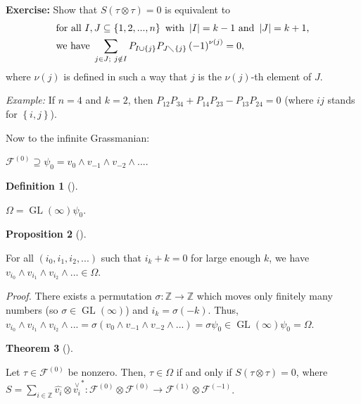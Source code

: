 \documentclass
[numbers=enddot,12pt,final,onecolumn,german,notitlepage]{scrartcl}%
\theoremstyle{definition}
\newtheorem{theo}{Theorem}
\newenvironment{theorem}[1][]
{\begin{theo}[#1]\begin{leftbar}}
{\end{leftbar}\end{theo}}
\newtheorem{prop}[theo]{Proposition}
\newenvironment{proposition}[1][]
{\begin{prop}[#1]\begin{leftbar}}
{\end{leftbar}\end{prop}}
\newtheorem{defi}[theo]{Definition}
\newenvironment{definition}[1][]
{\begin{defi}[#1]\begin{leftbar}}
{\end{leftbar}\end{defi}}
\begin{document}
\textbf{Exercise:} Show that $S\left(  \tau\otimes\tau\right)  =0$ is
equivalent to%
\begin{align*}
&  \text{for all }I,J\subseteq\left\{  1,2,...,n\right\}  \text{ with
}\left\vert I\right\vert =k-1\text{ and }\left\vert J\right\vert
=k+1\text{,}\\
&  \text{we have }\sum_{j\in J;\ j\notin I}P_{I\cup\left\{  j\right\}
}P_{J\diagdown\left\{  j\right\}  }\left(  -1\right)  ^{\nu\left(  j\right)
}=0,
\end{align*}
where $\nu\left(  j\right)  $ is defined in such a way that $j$ is the
$\nu\left(  j\right)  $-th element of $J$.

\textit{Example:} If $n=4$ and $k=2$, then $P_{12}P_{34}+P_{14}P_{23}%
-P_{13}P_{24}=0$ (where $ij$ stands for $\left\{  i,j\right\}  $).

Now to the infinite Grassmanian:

$\mathcal{F}^{\left(  0\right)  }\supseteq\psi_{0}=v_{0}\wedge v_{-1}\wedge
v_{-2}\wedge...$.

\begin{definition}
$\Omega=\operatorname*{GL}\left(  \infty\right)  \psi_{0}$.
\end{definition}

\begin{proposition}
For all $\left(  i_{0},i_{1},i_{2},...\right)  $ such that $i_{k}+k=0$ for
large enough $k$, we have $v_{i_{0}}\wedge v_{i_{1}}\wedge v_{i_{2}}%
\wedge...\in\Omega$.
\end{proposition}

\textit{Proof.} There exists a permutation $\sigma:\mathbb{Z}\rightarrow
\mathbb{Z}$ which moves only finitely many numbers (so $\sigma\in
\operatorname*{GL}\left(  \infty\right)  $) and $i_{k}=\sigma\left(
-k\right)  $. Thus, $v_{i_{0}}\wedge v_{i_{1}}\wedge v_{i_{2}}\wedge
...=\sigma\left(  v_{0}\wedge v_{-1}\wedge v_{-2}\wedge...\right)  =\sigma
\psi_{0}\in\operatorname*{GL}\left(  \infty\right)  \psi_{0}=\Omega$.

\begin{theorem}
Let $\tau\in\mathcal{F}^{\left(  0\right)  }$ be nonzero. Then, $\tau\in
\Omega$ if and only if $S\left(  \tau\otimes\tau\right)  =0$, where
$S=\sum\limits_{i\in\mathbb{Z}}\widehat{v_{i}}\otimes\overset{\vee}{v_{i}%
}^{\ast}:\mathcal{F}^{\left(  0\right)  }\otimes\mathcal{F}^{\left(  0\right)
}\rightarrow\mathcal{F}^{\left(  1\right)  }\otimes\mathcal{F}^{\left(
-1\right)  }$.
\end{theorem}
\end{document}
